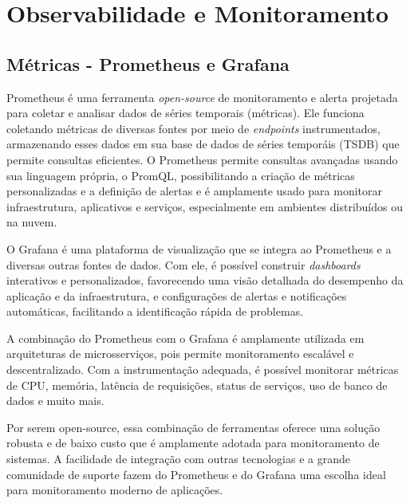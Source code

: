 \section{Observabilidade e Monitoramento}

\subsection{Métricas - Prometheus e Grafana}
Prometheus é uma ferramenta \emph{open-source} de monitoramento e alerta projetada para coletar e analisar dados de séries temporais (métricas). Ele funciona coletando métricas de diversas fontes por meio de \emph{endpoints} instrumentados, armazenando esses dados em sua base de dados de séries temporáis (TSDB) que permite consultas eficientes. O Prometheus permite consultas avançadas usando sua linguagem própria, o PromQL, possibilitando a criação de métricas personalizadas e a definição de alertas e é amplamente usado para monitorar infraestrutura, aplicativos e serviços, especialmente em ambientes distribuídos ou na nuvem. \cite{prometheus-docs}

O Grafana é uma plataforma de visualização que se integra ao Prometheus e a diversas outras fontes de dados. Com ele, é possível construir \emph{dashboards} interativos e personalizados, favorecendo uma visão detalhada do desempenho da aplicação e da infraestrutura, e configurações de alertas e notificações automáticas, facilitando a identificação rápida de problemas.

A combinação do Prometheus com o Grafana é amplamente utilizada em arquiteturas de microsserviços, pois permite monitoramento escalável e descentralizado. Com a instrumentação adequada, é possível monitorar métricas de CPU, memória, latência de requisições, status de serviços, uso de banco de dados e muito mais.

Por serem open-source, essa combinação de ferramentas oferece uma solução robusta e de baixo custo que é amplamente adotada para monitoramento de sistemas. A facilidade de integração com outras tecnologias e a grande comunidade de suporte fazem do Prometheus e do Grafana uma escolha ideal para monitoramento moderno de aplicações.


